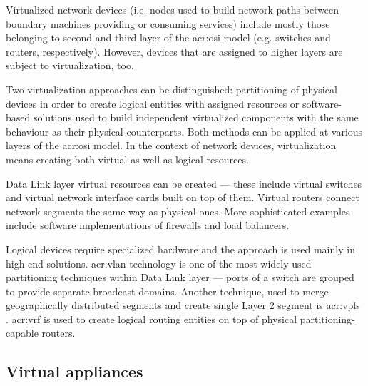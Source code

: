 \documentclass[11pt,openany]{book}
\begin{document}
        Virtualized network devices (i.e. nodes used to build network paths between boundary machines providing or
        consuming services) include mostly those belonging to second and third layer of the \gls{acr:osi} model (e.g.
        switches and routers, respectively). However, devices that are assigned to higher layers are subject to
        virtualization, too.

        Two virtualization approaches can be distinguished: partitioning of physical devices in order to create logical
        entities with assigned resources or software-based solutions used to build independent virtualized components
        with the same behaviour as their physical counterparts. Both methods can be applied at various layers of the
        \gls{acr:osi} model. In the context of network devices, virtualization means creating both virtual as well as
        logical resources.

        Data Link layer virtual resources can be created --- these include virtual switches and virtual network
        interface cards built on top of them. Virtual routers connect network segments the same way as physical ones.
        More sophisticated examples include software implementations of firewalls and load balancers.

        Logical devices require specialized hardware and the approach is used mainly in high-end solutions.
        \gls{acr:vlan} technology is one of the most widely used partitioning techniques within Data Link layer ---
        ports of a switch are grouped to provide separate broadcast domains. Another technique, used to merge
        geographically distributed segments and create single Layer 2 segment is \gls{acr:vpls} \cite{moreno}.
        \gls{acr:vrf} is used to create logical routing entities on top of physical partitioning-capable routers.


      \subsection{Virtual appliances}
      \label{sub:}


\end{document}
